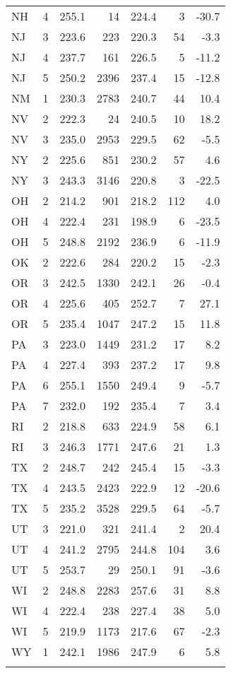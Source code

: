 \begin{longtable}{lcrr@{\extracolsep{10pt}}rr@{\extracolsep{10pt}}r}
  NH & 4 & 255.1 & 14 & 224.4 &  3 & -30.7 \\ 
  NJ & 3 & 223.6 & 223 & 220.3 & 54 & -3.3 \\ 
  NJ & 4 & 237.7 & 161 & 226.5 &  5 & -11.2 \\ 
  NJ & 5 & 250.2 & 2396 & 237.4 & 15 & -12.8 \\ 
  NM & 1 & 230.3 & 2783 & 240.7 & 44 & 10.4 \\ 
  NV & 2 & 222.3 & 24 & 240.5 & 10 & 18.2 \\ 
  NV & 3 & 235.0 & 2953 & 229.5 & 62 & -5.5 \\ 
  NY & 2 & 225.6 & 851 & 230.2 & 57 & 4.6 \\ 
  NY & 3 & 243.3 & 3146 & 220.8 &  3 & -22.5 \\ 
  OH & 2 & 214.2 & 901 & 218.2 & 112 & 4.0 \\ 
  OH & 4 & 222.4 & 231 & 198.9 &  6 & -23.5 \\ 
  OH & 5 & 248.8 & 2192 & 236.9 &  6 & -11.9 \\ 
  OK & 2 & 222.6 & 284 & 220.2 & 15 & -2.3 \\ 
  OR & 3 & 242.5 & 1330 & 242.1 & 26 & -0.4 \\ 
  OR & 4 & 225.6 & 405 & 252.7 &  7 & 27.1 \\ 
  OR & 5 & 235.4 & 1047 & 247.2 & 15 & 11.8 \\ 
  PA & 3 & 223.0 & 1449 & 231.2 & 17 & 8.2 \\ 
  PA & 4 & 227.4 & 393 & 237.2 & 17 & 9.8 \\ 
  PA & 6 & 255.1 & 1550 & 249.4 &  9 & -5.7 \\ 
  PA & 7 & 232.0 & 192 & 235.4 &  7 & 3.4 \\ 
  RI & 2 & 218.8 & 633 & 224.9 & 58 & 6.1 \\ 
  RI & 3 & 246.3 & 1771 & 247.6 & 21 & 1.3 \\ 
  TX & 2 & 248.7 & 242 & 245.4 & 15 & -3.3 \\ 
  TX & 4 & 243.5 & 2423 & 222.9 & 12 & -20.6 \\ 
  TX & 5 & 235.2 & 3528 & 229.5 & 64 & -5.7 \\ 
  UT & 3 & 221.0 & 321 & 241.4 &  2 & 20.4 \\ 
  UT & 4 & 241.2 & 2795 & 244.8 & 104 & 3.6 \\ 
  UT & 5 & 253.7 & 29 & 250.1 & 91 & -3.6 \\ 
  WI & 2 & 248.8 & 2283 & 257.6 & 31 & 8.8 \\ 
  WI & 4 & 222.4 & 238 & 227.4 & 38 & 5.0 \\ 
  WI & 5 & 219.9 & 1173 & 217.6 & 67 & -2.3 \\ 
  WY & 1 & 242.1 & 1986 & 247.9 &  6 & 5.8 \\ 
  \hline
\label{g4mathCIT1}
\end{longtable}

